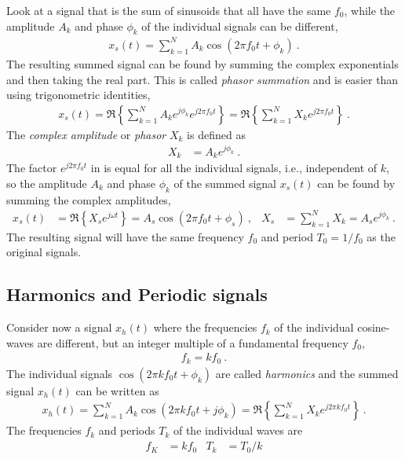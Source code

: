 Look at a signal that is the sum of sinusoids that all have the same $f_0$, while the amplitude $A_k$ and phase $\phi_k$ of the individual signals can be different, 
\begin{align}
	x_s(t)= \sum_{k=1}^{N} A_k \cos(2\pi f_0 t + \phi_k)   \:.
\end{align}
The resulting summed signal can be found by summing the complex exponentials and then taking the real part. This is called \emph{phasor summation} and is  easier than using trigonometric identities, 
\begin{align}
	x_s(t)= \Re\left\{ \sum_{k=1}^{N}  A_k e^{j\phi_k} e^{j2\pi f_0 t } \right\}  
			= \Re\left\{ \sum_{k=1}^{N}  X_k  e^{j2\pi f_0 t } \right\}  \:.
	\label{eq:phasorsum}
\end{align}
The \emph{complex amplitude }or \emph{phasor} $X_k$ is defined as 
\begin{align}
	X_k &= A_k e^{j\phi_k} \:.
\end{align}
The factor $ e^{j2\pi f_0 t}$ in  is equal for all the individual signals, i.e., independent of $k$, so the amplitude $A_k$ and phase $\phi_k$ of the summed signal $x_s(t)$ can be found by summing the complex amplitudes, 
\begin{align}
	x_s(t)&= \Re \left\{ X_s e^{j\omega t } \right\} = A_s \cos(2\pi f_0 t + \phi_s)  \:,
	 &  X_s&= \sum_{k=1}^{N} X_k = A_s e^{j\phi_k}  \:.
\end{align}
The resulting signal will have the same frequency $f_0$ and period $T_0=1/f_0$ as the original signals. 

\subsection{Harmonics and Periodic signals}
Consider now a signal $x_h(t)$ where the frequencies $f_k$ of the individual cosine-waves are different, but an integer multiple of a fundamental frequency $f_0$, 
\begin{align}
	f_k = k f_0  \:.
\end{align}
The individual signals $\cos(2\pi k f_0 t +\phi_k)$ are called \emph{harmonics} and the summed signal $x_h(t)$ can be written as
\begin{align}
	x_h(t)= \sum_{k=1}^{N}  A_k \cos(2\pi k f_0 t +j\phi_k)
		= \Re\left\{ \sum_{k=1}^{N}  X_k  e^{j2\pi k f_0 t } \right\}  \:.
		\label{eq:harmonicsum}
\end{align}
The frequencies $f_k$ and periods $T_k$ of the individual waves are 
\begin{align}
	f_K &= k f_0  & T_k &= T_0/k
\end{align}

